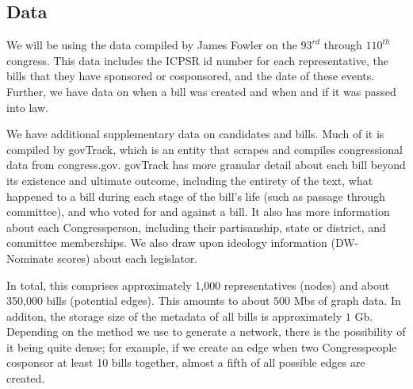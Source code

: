 \subsection{Data}

We will be using the data compiled by James Fowler on the $93^{rd}$ through
$110^{th}$ congress. This data includes the ICPSR id number for each
representative, the bills that they have sponsored or cosponsored, and the date
of these events.  Further, we have data on when a bill was created and when and
if it was passed into law.

We have additional supplementary data on candidates and bills. Much of it is
compiled by govTrack, which is an entity that scrapes and compiles congressional
data from congress.gov. govTrack has more granular detail about each bill beyond
its existence and ultimate outcome, including the  entirety of the text, what
happened to a bill during each stage of the  bill's life (such as passage
through committee), and who voted for and against a bill. It also has more
information about each Congressperson, including their partisanship, state or
district, and committee memberships. We also draw upon ideology information (DW-
Nominate scores) about each legislator.

In total, this comprises approximately 1,000 representatives (nodes) and about
350,000 bills (potential edges). This amounts to about $500$ Mbs of graph
data. In additon, the storage size of the metadata of all bills is
approximately $1$ Gb. Depending on the method we use to generate a network,
there is the possibility of it being quite dense; for example, if we create an
edge when two Congresspeople cosponsor at least 10 bills together, almost a
fifth of all possible edges are created.
